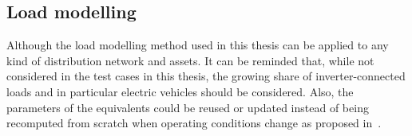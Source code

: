 \subsection*{Load modelling}

Although the load modelling method used in this thesis can be applied to any kind of distribution network and assets. It can be reminded that, while not considered in the test cases in this thesis, the growing share of inverter-connected loads and in particular electric vehicles should be considered. Also, the parameters of the equivalents could be reused or updated instead of being recomputed from scratch when operating conditions change as proposed in~\cite{ChaspierreThesis}.
